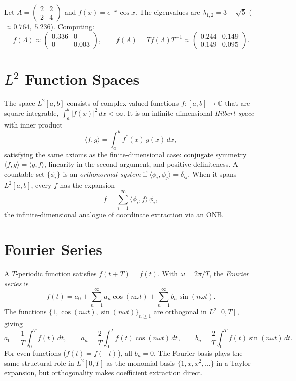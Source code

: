 \begin{example}
Let $A=\begin{pmatrix}2&2\\2&4\end{pmatrix}$ and $f(x)=e^{-x}\cos x$. The eigenvalues are $\lambda_{1,2}=3\mp\sqrt{5}$ ($\approx0.764,\;5.236$). Computing:
\[
  f(\Lambda)\approx\begin{pmatrix}0.336&0\\0&0.003\end{pmatrix},
  \qquad
  f(A)=Tf(\Lambda)T^{-1}\approx\begin{pmatrix}0.244&0.149\\0.149&0.095\end{pmatrix}.
\]
\end{example}

\section{$L^2$ Function Spaces}
\label{sec:l2}

The space $L^2[a,b]$ consists of complex-valued functions $f:[a,b]\to\mathbb{C}$ that are square-integrable, $\int_a^b|f(x)|^2\,dx<\infty$. It is an infinite-dimensional \emph{Hilbert space} with inner product
\[
  \langle f,g\rangle = \int_a^b f^*(x)\,g(x)\,dx,
\]
satisfying the same axioms as the finite-dimensional case: conjugate symmetry $\langle f,g\rangle=\overline{\langle g,f\rangle}$, linearity in the second argument, and positive definiteness. A countable set $\{\phi_i\}$ is an \emph{orthonormal system} if $\langle\phi_i,\phi_j\rangle=\delta_{ij}$. When it spans $L^2[a,b]$, every $f$ has the expansion
\[
  f = \sum_{i=1}^\infty \langle\phi_i,f\rangle\,\phi_i,
\]
the infinite-dimensional analogue of coordinate extraction via an ONB.

\section{Fourier Series}

A $T$-periodic function satisfies $f(t+T)=f(t)$. With $\omega=2\pi/T$, the \emph{Fourier series} is
\[
  f(t) = a_0 + \sum_{n=1}^\infty a_n\cos(n\omega t) + \sum_{n=1}^\infty b_n\sin(n\omega t).
\]
The functions $\{1,\cos(n\omega t),\sin(n\omega t)\}_{n\ge1}$ are orthogonal in $L^2[0,T]$, giving
\[
  a_0 = \frac{1}{T}\int_0^T f(t)\,dt,\qquad
  a_n = \frac{2}{T}\int_0^T f(t)\cos(n\omega t)\,dt,\qquad
  b_n = \frac{2}{T}\int_0^T f(t)\sin(n\omega t)\,dt.
\]
For even functions ($f(t)=f(-t)$), all $b_n=0$. The Fourier basis plays the same structural role in $L^2[0,T]$ as the monomial basis $\{1,x,x^2,\ldots\}$ in a Taylor expansion, but orthogonality makes coefficient extraction direct.

